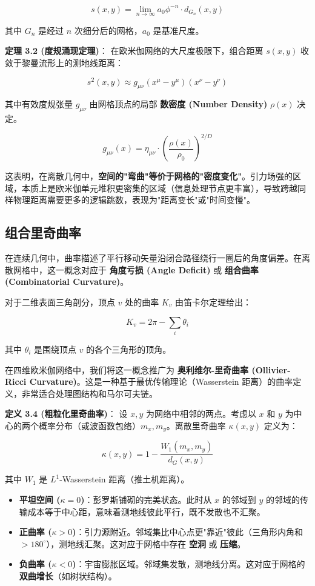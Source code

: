 \[s(x, y) = \lim_{n \to \infty} a_0 \phi^{-n} \cdot d_{G_n}(x, y)\]

其中 $G_n$ 是经过 $n$ 次细分后的网格，$a_0$ 是基准尺度。

\textbf{定理 3.2 (度规涌现定理)}：
在欧米伽网络的大尺度极限下，组合距离 $s(x,y)$ 收敛于黎曼流形上的测地线距离：

\[s^2(x, y) \approx g_{\mu\nu} (x^\mu - y^\mu) (x^\nu - y^\nu)\]

其中有效度规张量 $g_{\mu\nu}$ 由网格顶点的局部 \textbf{数密度 (Number Density)} $\rho(x)$ 决定。

\[g_{\mu\nu}(x) = \eta_{\mu\nu} \cdot \left( \frac{\rho(x)}{\rho_0} \right)^{2/D}\]

这表明，在离散几何中，\textbf{空间的"弯曲"等价于网格的"密度变化"}。引力场强的区域，本质上是欧米伽单元堆积更密集的区域（信息处理节点更丰富），导致跨越同样物理距离需要更多的逻辑跳数，表现为"距离变长"或"时间变慢"。

\subsection{组合里奇曲率}

在连续几何中，曲率描述了平行移动矢量沿闭合路径绕行一圈后的角度偏差。在离散网格中，这一概念对应于 \textbf{角度亏损 (Angle Deficit)} 或 \textbf{组合曲率 (Combinatorial Curvature)}。

对于二维表面三角剖分，顶点 $v$ 处的曲率 $K_v$ 由笛卡尔定理给出：

\[K_v = 2\pi - \sum_{i} \theta_i\]

其中 $\theta_i$ 是围绕顶点 $v$ 的各个三角形的顶角。

在四维欧米伽网络中，我们将这一概念推广为 \textbf{奥利维尔-里奇曲率 (Ollivier-Ricci Curvature)}。这是一种基于最优传输理论（Wasserstein 距离）的曲率定义，非常适合处理图结构和马尔可夫链。

\textbf{定义 3.4 (粗粒化里奇曲率)}：
设 $x, y$ 为网络中相邻的两点。考虑以 $x$ 和 $y$ 为中心的两个概率分布（或波函数包络）$m_x, m_y$。离散里奇曲率 $\kappa(x, y)$ 定义为：

\[\kappa(x, y) = 1 - \frac{W_1(m_x, m_y)}{d_G(x, y)}\]

其中 $W_1$ 是 $L^1$-Wasserstein 距离（推土机距离）。

\begin{itemize}
\item \textbf{平坦空间 ($\kappa = 0$)}：彭罗斯铺砌的完美状态。此时从 $x$ 的邻域到 $y$ 的邻域的传输成本等于中心距，意味着测地线彼此平行，既不发散也不汇聚。
\item \textbf{正曲率 ($\kappa > 0$)}：引力源附近。邻域集比中心点更"靠近"彼此（三角形内角和 $> 180^\circ$），测地线汇聚。这对应于网格中存在 \textbf{空洞} 或 \textbf{压缩}。
\item \textbf{负曲率 ($\kappa < 0$)}：宇宙膨胀区域。邻域集发散，测地线分离。这对应于网格的 \textbf{双曲增长}（如树状结构）。
\end{itemize}

